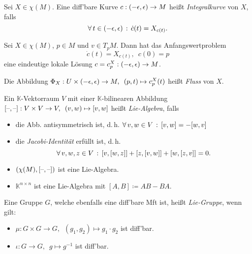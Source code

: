 \documentclass{cheat-sheet}
\newcommand{\K}{\mathbb{K}} %
\begin{document}

\begin{defn}
  Sei $X \in \chi(M)$. Eine diff'bare Kurve $c : \left( -\epsilon, \epsilon \right) \to M$ heißt \emph{Integralkurve} von $X$, falls
  \[ \forall \, {t \in \left( -\epsilon, \epsilon \right)} \,:\, \dot{c}(t) = X_{c(t)}. \]
\end{defn}

\begin{lem}
  Sei $X \in \chi(M)$, $p \in M$ und $v \in T_p M$. Dann hat das Anfangswertproblem
  \[ \dot{c}(t) = X_{c(t)}, \enspace c(0) = p \]
  eine eindeutige lokale Lösung $c = c_p^X : \left( -\epsilon, \epsilon \right) \to M$.
\end{lem}

\begin{defn}
  Die Abbildung $\Phi_X : U \times \left( -\epsilon, \epsilon \right) \to M, \enspace (p, t) \mapsto c_p^X(t)$ heißt \emph{Fluss} von $X$.
\end{defn}


\begin{defn}
  Ein $\K$-Vektorraum $V$ mit einer $\K$-bilinearen Abbildung $[\text{--},\text{--}] : V \times V \to V, \enspace (v, w) \mapsto [v,w]$ heißt \emph{Lie-Algebra}, falls
  \begin{itemize}
    \item die Abb. antisymmetrisch ist, d.\,h. $\forall \, {v, w \in V} \,:\, [v, w] = - [w, v]$
    \item die \emph{Jacobi-Identität} erfüllt ist, d.\,h.
    \[ \forall \, {v,w,z \in V} \,:\, [v, [w, z]] + [z, [v, w]] + [w, [z, v]] = 0. \]
  \end{itemize}
\end{defn}

\begin{bspe}
  \begin{itemize}
    \item $(\chi(M), [\text{--},\text{--}])$ ist eine Lie-Algebra.
    \item $\K^{n \times n}$ ist eine Lie-Algebra mit $[A, B] \coloneqq AB - BA$.
  \end{itemize}
\end{bspe}

\begin{defn}
  Eine Gruppe $G$, welche ebenfalls eine diff'bare Mft ist, heißt \emph{Lie-Gruppe}, wenn gilt:
  \begin{itemize}
    \item $\mu : G \times G \to G, \enspace (g_1, g_2) \mapsto g_1 \cdot g_2$ ist diff'bar.
    \item $\iota : G \to G, \enspace g \mapsto g^{-1}$ ist diff'bar.
  \end{itemize}
\end{defn}
\end{document}
